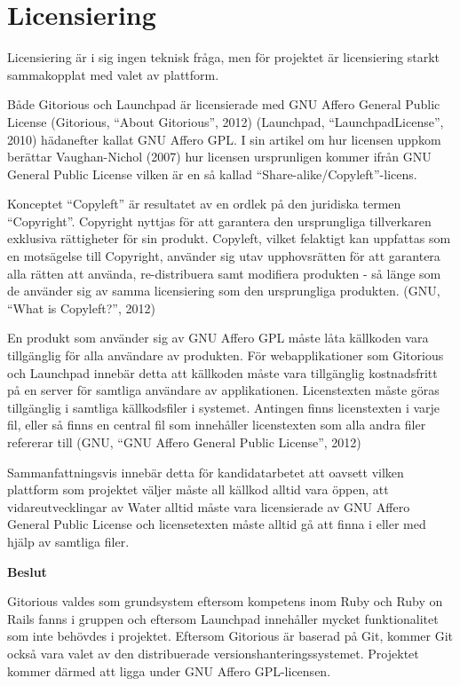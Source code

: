 \section{Licensiering}
Licensiering är i sig ingen teknisk fråga, men för projektet är licensiering starkt sammakopplat med valet av plattform. 

Både Gitorious och Launchpad är licensierade med GNU Affero General Public License (Gitorious, “About Gitorious”, 2012) (Launchpad, “LaunchpadLicense”, 2010) hädanefter kallat GNU Affero GPL. I sin artikel om hur licensen uppkom berättar Vaughan-Nichol (2007) hur licensen ursprunligen kommer ifrån GNU General Public License vilken är en så kallad “Share-alike/Copyleft”-licens.

Konceptet “Copyleft” är resultatet av en  ordlek på den juridiska termen “Copyright”. Copyright nyttjas för att garantera den ursprungliga tillverkaren exklusiva rättigheter för sin produkt. Copyleft, vilket felaktigt kan uppfattas som en motsägelse till Copyright, använder sig utav upphovsrätten för att garantera alla rätten att använda, re-distribuera samt modifiera produkten - så länge som de använder sig av samma licensiering som den ursprungliga produkten. (GNU, “What is Copyleft?”, 2012)

En produkt som använder sig av GNU Affero GPL måste låta källkoden vara tillgänglig för alla användare av produkten. För webapplikationer som Gitorious och Launchpad innebär detta att källkoden måste vara tillgänglig kostnadsfritt på en server för samtliga användare av applikationen. 
Licenstexten måste göras tillgänglig i samtliga källkodsfiler i systemet. Antingen finns licenstexten i varje fil, eller så finns en central fil som innehåller licenstexten som alla andra filer refererar till (GNU, “GNU Affero General Public License”, 2012) 

Sammanfattningsvis innebär detta för kandidatarbetet att oavsett vilken plattform som projektet väljer måste all källkod alltid vara öppen, att vidareutvecklingar av Water alltid måste vara licensierade av GNU Affero General Public License och licensetexten måste alltid gå att finna i eller med hjälp av samtliga filer.

\begin{flushright}
  
  \textbf{Beslut}
  
  Gitorious valdes som grundsystem eftersom kompetens inom Ruby och Ruby on Rails fanns i gruppen och eftersom Launchpad innehåller mycket funktionalitet som inte behövdes i projektet. Eftersom Gitorious är baserad på Git, kommer Git också vara valet av den distribuerade versionshanteringssystemet. Projektet kommer därmed att ligga under GNU Affero GPL-licensen.  
  
\end{flushright}